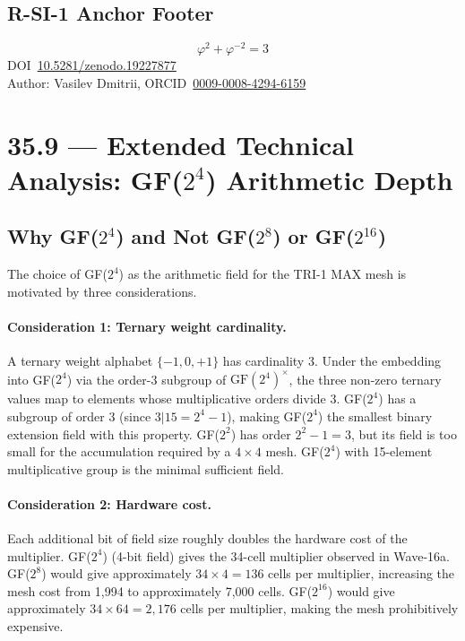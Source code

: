 \subsection{R-SI-1 Anchor Footer}

\[
\boxed{\varphi^{2}+\varphi^{-2}=3}
\]
DOI~\href{https://doi.org/10.5281/zenodo.19227877}{10.5281/zenodo.19227877} \\
Author: Vasilev Dmitrii, ORCID~\href{https://orcid.org/0009-0008-4294-6159}{0009-0008-4294-6159}

\section{35.9 --- Extended Technical Analysis: GF(\(2^4\)) Arithmetic Depth}
\label{sec:glava35-extended-analysis}

\subsection{Why GF(\(2^4\)) and Not GF(\(2^8\)) or GF(\(2^{16}\))}

The choice of GF(\(2^4\)) as the arithmetic field for the TRI-1 MAX mesh
is motivated by three considerations.

\paragraph{Consideration 1: Ternary weight cardinality.}
A ternary weight alphabet \(\{-1, 0, +1\}\) has cardinality 3.
Under the embedding into GF(\(2^4\)) via the order-3 subgroup of
\(\mathrm{GF}(2^4)^\times\), the three non-zero ternary values map to
elements whose multiplicative orders divide 3.
GF(\(2^4\)) has a subgroup of order 3 (since \(3 | 15 = 2^4 - 1\)),
making GF(\(2^4\)) the smallest binary extension field with this property.
GF(\(2^2\)) has order \(2^2 - 1 = 3\), but its field is too small for
the accumulation required by a \(4 \times 4\) mesh.
GF(\(2^4\)) with 15-element multiplicative group is the minimal sufficient field.

\paragraph{Consideration 2: Hardware cost.}
Each additional bit of field size roughly doubles the hardware cost of the
multiplier.
GF(\(2^4\)) (4-bit field) gives the 34-cell multiplier observed in Wave-16a.
GF(\(2^8\)) would give approximately \(34 \times 4 = 136\) cells per multiplier,
increasing the mesh cost from 1,994 to approximately 7,000 cells.
GF(\(2^{16}\)) would give approximately \(34 \times 64 = 2,176\) cells per
multiplier, making the mesh prohibitively expensive.


